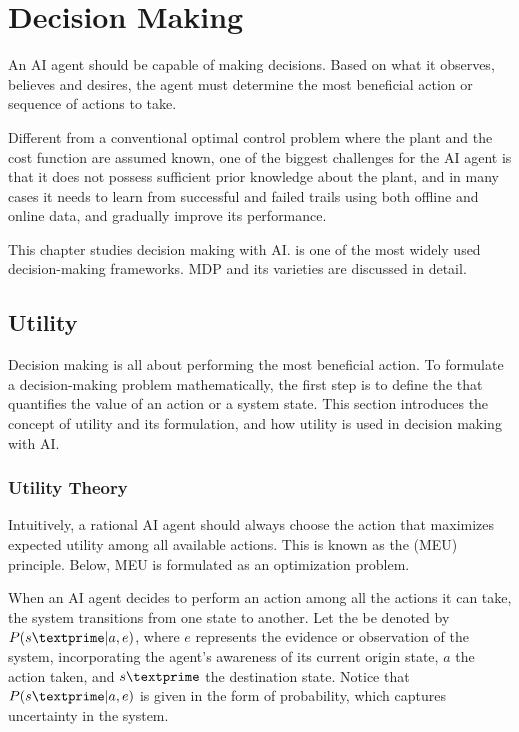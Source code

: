 \chapter{Decision Making}

An AI agent should be capable of making decisions. Based on what it observes, believes and desires, the agent must determine the most beneficial action or sequence of actions to take. 

Different from a conventional optimal control problem where the plant and the cost function are assumed known, one of the biggest challenges for the AI agent is that it does not possess sufficient prior knowledge about the plant, and in many cases it needs to learn from successful and failed trails using both offline and online data, and gradually improve its performance.

This chapter studies decision making with AI.  is one of the most widely used decision-making frameworks. MDP and its varieties are discussed in detail.

\section{Utility}

Decision making is all about performing the most beneficial action. To formulate a decision-making problem mathematically, the first step is to define the  that quantifies the value of an action or a system state. This section introduces the concept of utility and its formulation, and how utility is used in decision making with AI.

\subsection{Utility Theory}

Intuitively, a rational AI agent should always choose the action that maximizes expected utility among all available actions. This is known as the  (MEU) principle. Below, MEU is formulated as an optimization problem.

When an AI agent decides to perform an action among all the actions it can take, the system transitions from one state to another. Let the  be denoted by $P(s\textprime|a,e)$, where $e$ represents the evidence or observation of the system, incorporating the agent’s awareness of its current origin state, $a$ the action taken, and $s\textprime$ the destination state. Notice that $P(s\textprime|a,e)$ is given in the form of probability, which captures uncertainty in the system.

